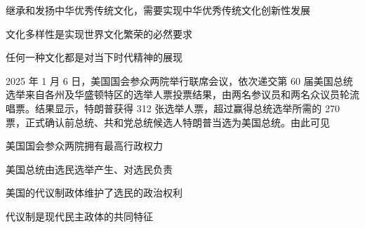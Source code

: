 \documentclass{exam-zh}
\begin{document}
\begin{question}
   继承和发扬中华优秀传统文化，需要实现中华优秀传统文化创新性发展

   文化多样性是实现世界文化繁荣的必然要求

   任何一种文化都是对当下时代精神的展现

  \begin{choices}
  \item {}
  \item {}
  \item {}
  \item {}
  \end{choices}
\end{question}

\begin{question}
  2025 年 1 月 6 日，美国国会参众两院举行联席会议，依次递交第 60 届美国总统选举来自各州及华盛顿特区的选举人票投票结果，由两名参议员和两名众议员轮流唱票。结果显示，特朗普获得 312 张选举人票，超过赢得总统选举所需的 270 票，正式确认前总统、共和党总统候选人特朗普当选为美国总统。由此可见

   美国国会参众两院拥有最高行政权力

   美国总统由选民选举产生、对选民负责

   美国的代议制政体维护了选民的政治权利

   代议制是现代民主政体的共同特征

  \begin{choices}
  \item {}
  \item {}
  \item {}
  \item {}
  \end{choices}
\end{question}
\end{document}
